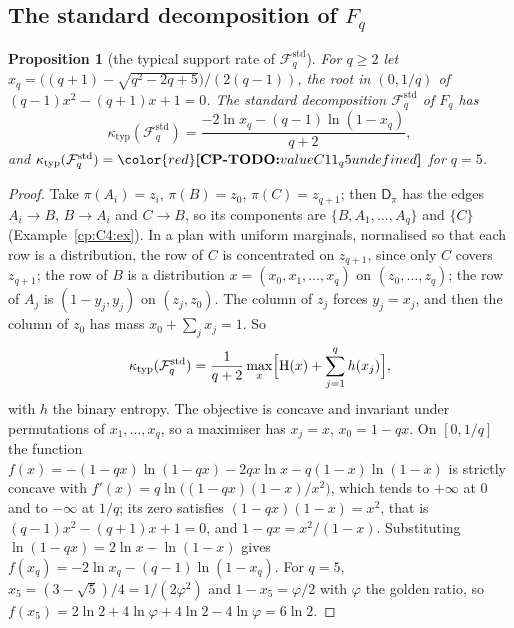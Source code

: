 \documentclass[11pt]{article}
\makeatletter
\newtheorem{proposition}[theorem]{Proposition}
\theoremstyle{definition}
\theoremstyle{remark}
\DeclareRobustCommand{\CPTODO}[1]{{\color{red}\textbf{[CP-TODO:} #1\textbf{]}}}
\newcommand{\Ent}{\mathrm{H}}                 %
\newcommand{\Hb}{h}                           %
\newcommand{\Fstd}{\mathcal{F}^{\mathrm{std}}_q} %
\newcommand{\ktyp}{\kappa_{\mathrm{typ}}}    %
\newcommand{\Dpi}{\mathsf D_\pi}             %
\newcommand{\cpv}[1]{\ifcsname cpv@#1\endcsname\csname cpv@#1\endcsname\else\CPTODO{value #1 undefined}\fi}
\makeatother
\begin{document}
\subsection{The standard decomposition of \texorpdfstring{$F_q$}{F\_q}}\label{cp:sec:std:Fq}

\begin{proposition}[the typical support rate of $\Fstd$]\label{cp:C11}
For $q\ge2$ let $x_q=\bigl((q+1)-\sqrt{q^2-2q+5}\bigr)/(2(q-1))$, the root in $(0,1/q)$ of $(q-1)x^2-(q+1)x+1=0$. The standard decomposition $\Fstd$ of $F_q$ has
\[
\ktyp(\Fstd)=\frac{-2\ln x_q-(q-1)\ln(1-x_q)}{q+2},
\]
and $\ktyp(\Fstd)=\cpv{C11_q5}$ for $q=5$.
\end{proposition}

\begin{proof}
Take $\pi(A_i)=z_i$, $\pi(B)=z_0$, $\pi(C)=z_{q+1}$; then $\Dpi$ has the edges $A_i\to B$, $B\to A_i$ and $C\to B$, so its components are $\{B,A_1,\dots,A_q\}$ and $\{C\}$ (Example~\ref{cp:C4:ex}). In a plan with uniform marginals, normalised so that each row is a distribution, the row of $C$ is concentrated on $z_{q+1}$, since only $C$ covers $z_{q+1}$; the row of $B$ is a distribution $x=(x_0,x_1,\dots,x_q)$ on $(z_0,\dots,z_q)$; the row of $A_j$ is $(1-y_j,y_j)$ on $(z_j,z_0)$. The column of $z_j$ forces $y_j=x_j$, and then the column of $z_0$ has mass $x_0+\sum_jx_j=1$. So
\[
\ktyp(\Fstd)=\frac1{q+2}\max_x\Bigl[\Ent(x)+\sum_{j=1}^q\Hb(x_j)\Bigr],
\]
with $\Hb$ the binary entropy. The objective is concave and invariant under permutations of $x_1,\dots,x_q$, so a maximiser has $x_j=x$, $x_0=1-qx$. On $[0,1/q]$ the function $f(x)=-(1-qx)\ln(1-qx)-2qx\ln x-q(1-x)\ln(1-x)$ is strictly concave with $f'(x)=q\ln\bigl((1-qx)(1-x)/x^2\bigr)$, which tends to $+\infty$ at $0$ and to $-\infty$ at $1/q$; its zero satisfies $(1-qx)(1-x)=x^2$, that is $(q-1)x^2-(q+1)x+1=0$, and $1-qx=x^2/(1-x)$. Substituting $\ln(1-qx)=2\ln x-\ln(1-x)$ gives $f(x_q)=-2\ln x_q-(q-1)\ln(1-x_q)$. For $q=5$, $x_5=(3-\sqrt5)/4=1/(2\varphi^2)$ and $1-x_5=\varphi/2$ with $\varphi$ the golden ratio, so $f(x_5)=2\ln2+4\ln\varphi+4\ln2-4\ln\varphi=6\ln2$.
\end{proof}
\end{document}

